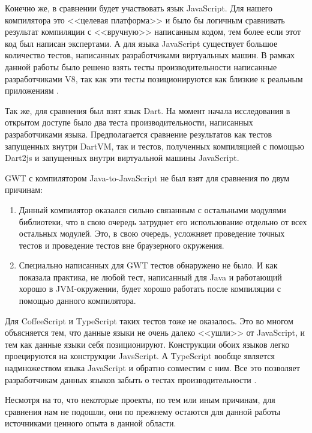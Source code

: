 Конечно же, в сравнении будет участвовать язык JavaScript. Для нашего компилятора это <<целевая платформа>> и было бы логичным сравнивать результат компиляции с <<вручную>> написанным кодом, тем более если этот код был написан экспертами. А для языка JavaScript существует большое количество тестов, написанных разработчиками виртуальных машин. В рамках данной работы было решено взять тесты производительности написанные разработчиками V8, так как эти тесты позиционируются как близкие к реальным приложениям \cite{V8:Benchmarks, Octane, Dromaeo}.

Так же, для сравнения был взят язык Dart. На момент начала исследования в открытом доступе было два теста производительности, написанных разработчиками языка. Предполагается сравнение результатов как тестов запущенных внутри DartVM, так и тестов, полученных компиляцией с помощью Dart2js и запущенных внутри виртуальной машины JavaScript.

GWT с компилятором Java-to-JavaScript не был взят для сравнения по двум причинам:
\begin{enumerate}
\item Данный компилятор оказался сильно связанным с остальными модулями библиотеки, что в свою очередь затруднет его использование отдельно от всех остальных модулей. Это, в свою очередь, усложняет проведение точных тестов и проведение тестов вне браузерного окружения.
\item Специально написанных для GWT тестов обнаружено не было. И как показала практика, не любой тест, написанный для Java и работающий хорошо в JVM-окружении, будет хорошо работать после компиляции с помощью данного компилятора.
\end{enumerate}

Для CoffeeScript и TypeScript таких тестов тоже не оказалось. Это во многом объясняется тем, что данные языки не очень далеко <<ушли>> от JavaScript, и тем как данные языки себя позиционируют. Конструкции обоих языков легко проецируются на конструкции JavsScript. А TypeScript вообще является надмножеством языка JavaScript и обратно совместим с ним. Все это позволяет разработчикам данных языков забыть о тестах производительности \cite{CoffeeScript}.

Несмотря на то, что некоторые проекты, по тем или иным причинам, для сравнения нам не подошли, они по прежнему остаются для данной работы источниками ценного опыта в данной области.